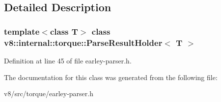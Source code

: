 \subsection{Detailed Description}
\subsubsection*{template$<$class T$>$\newline
class v8\+::internal\+::torque\+::\+Parse\+Result\+Holder$<$ T $>$}



Definition at line 45 of file earley-\/parser.\+h.



The documentation for this class was generated from the following file\+:\begin{DoxyCompactItemize}
\item 
v8/src/torque/earley-\/parser.\+h\end{DoxyCompactItemize}
